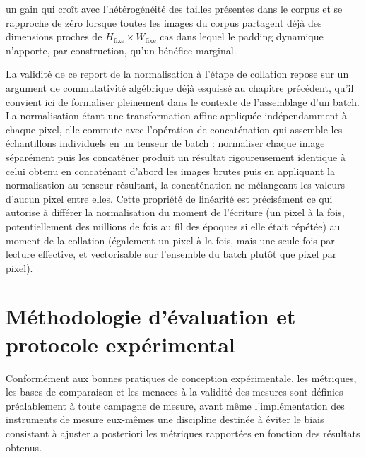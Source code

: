 \documentclass[12pt,a4paper]{report}
\begin{document}
un gain qui croît avec l'hétérogénéité des tailles présentes dans le corpus et se rapproche de zéro lorsque toutes les images du corpus partagent déjà des dimensions proches de $H_{\text{fixe}} \times W_{\text{fixe}}$ cas dans lequel le padding dynamique n'apporte, par construction, qu'un bénéfice marginal.

La validité de ce report de la normalisation à l'étape de collation repose sur un argument de commutativité algébrique déjà esquissé au chapitre précédent, qu'il convient ici de formaliser pleinement dans le contexte de l'assemblage d'un batch. La normalisation étant une transformation affine appliquée indépendamment à chaque pixel, elle commute avec l'opération de concaténation qui assemble les échantillons individuels en un tenseur de batch : normaliser chaque image séparément puis les concaténer produit un résultat rigoureusement identique à celui obtenu en concaténant d'abord les images brutes puis en appliquant la normalisation au tenseur résultant, la concaténation ne mélangeant les valeurs d'aucun pixel entre elles. Cette propriété de linéarité est précisément ce qui autorise à différer la normalisation du moment de l'écriture (un pixel à la fois, potentiellement des millions de fois au fil des époques si elle était répétée) au moment de la collation (également un pixel à la fois, mais une seule fois par lecture effective, et vectorisable sur l'ensemble du batch plutôt que pixel par pixel).

\section{Méthodologie d'évaluation et protocole expérimental}
\label{sec:methodologie}

Conformément aux bonnes pratiques de conception expérimentale, les métriques, les bases de comparaison et les menaces à la validité des mesures sont définies préalablement à toute campagne de mesure, avant même l'implémentation des instruments de mesure eux-mêmes une discipline destinée à éviter le biais consistant à ajuster a posteriori les métriques rapportées en fonction des résultats obtenus.
\end{document}
